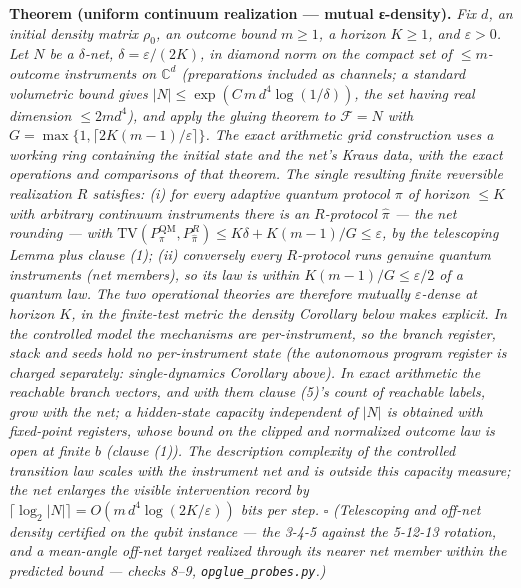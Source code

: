 \documentclass[
]{article}
\begin{document}
\textbf{Theorem (uniform continuum realization --- mutual ε-density).}
\emph{Fix \(d\), an initial density matrix \(\rho_0\), an outcome bound
\(m\geq 1\), a horizon \(K\geq 1\), and \(\varepsilon > 0\). Let \(N\)
be a \(\delta\)-net, \(\delta = \varepsilon/(2K)\), in diamond norm on
the compact set of \(\leq m\)-outcome instruments on \(\mathbb{C}^d\)
(preparations included as channels; a standard volumetric bound gives
\(|N| \leq \exp(C\, m\, d^4 \log(1/\delta))\), the set having real
dimension \(\leq 2 m d^4\)), and apply the gluing theorem to
\(\mathcal{F} = N\) with
\(G = \max\{1,\lceil 2K(m{-}1)/\varepsilon \rceil\}\). The exact
arithmetic grid construction uses a working ring containing the initial
state and the net's Kraus data, with the exact operations and
comparisons of that theorem. The single resulting finite reversible
realization \(R\) satisfies: (i) for every adaptive quantum protocol
\(\pi\) of horizon \(\leq K\) with arbitrary continuum instruments there
is an \(R\)-protocol \(\hat\pi\) --- the net rounding --- with
\(\mathrm{TV}(P_\pi^{\mathrm{QM}}, P_{\hat\pi}^{R}) \leq K\delta + K(m{-}1)/G \leq \varepsilon\),
by the telescoping Lemma plus clause (1); (ii) conversely every
\(R\)-protocol runs genuine quantum instruments (net members), so its
law is within \(K(m{-}1)/G \leq \varepsilon/2\) of a quantum law. The
two operational theories are therefore mutually \(\varepsilon\)-dense at
horizon \(K\), in the finite-test metric the density Corollary below
makes explicit. In the controlled model the mechanisms are
per-instrument, so the branch register, stack and seeds hold no
per-instrument state (the autonomous program register is charged
separately: single-dynamics Corollary above). In exact arithmetic the
reachable branch vectors, and with them clause (5)'s count of reachable
labels, grow with the net; a hidden-state capacity independent of
\(|N|\) is obtained with fixed-point registers, whose bound on the
clipped and normalized outcome law is open at finite \(b\) (clause (1)).
The description complexity of the controlled transition law scales with
the instrument net and is outside this capacity measure; the net
enlarges the visible intervention record by
\(\lceil \log_2 |N| \rceil = O(m\, d^4 \log(2K/\varepsilon))\) bits per
step.} \(\square\) \emph{(Telescoping and off-net density certified on
the qubit instance --- the 3-4-5 against the 5-12-13 rotation, and a
mean-angle off-net target realized through its nearer net member within
the predicted bound --- checks 8--9, \texttt{opglue\_probes.py}.)}
\end{document}
